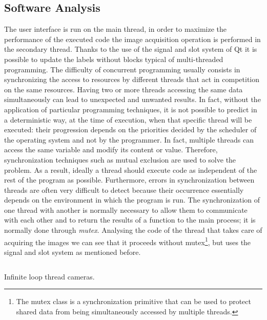 \subsection{Software Analysis}
\label{ssec:raspberry-softw-analysis}
The user interface is run on the main thread, in order to maximize the
performance of the executed code the image acquisition operation is performed in
the secondary thread. Thanks to the use of the signal and slot system of Qt it
is possible to update the labels without blocks typical of multi-threaded
programming. 
The difficulty of concurrent programming usually consists in
synchronizing the access to resources by different threads that act in
competition on the same resources. Having two or more threads accessing the same
data simultaneously can lead to unexpected and unwanted results. 
In fact, without the application of particular programming techniques, it is not
possible to predict in a deterministic way, at the time of execution, when that
specific thread will be executed: their progression depends on the priorities
decided by the scheduler of the operating system and not by the programmer. 
In fact, multiple threads can access the same variable and modify its content or
value. Therefore, synchronization techniques such as mutual exclusion are used
to solve the problem. As a result, ideally a thread should execute code as
independent of the rest of the program as possible. Furthermore, errors in
synchronization between threads are often very difficult to detect because their
occurrence essentially depends on the environment in which the program is run.
The synchronization of one thread with another is normally necessary to allow
them to communicate with each other and to return the results of a function to
the main process; it is normally done through \emph{mutex}\cite{wiki:thread}.
Analysing the code of the thread that takes care of acquiring the images we can 
see that it proceeds without mutex\footnote{The mutex class is a synchronization
primitive that can be used to protect shared data from being simultaneously
accessed by multiple threads.}, but uses the signal and slot system as mentioned
before.
%
\begin{listing}[ht] 
\inputminted[bgcolor=bg,frame=lines,framesep=2mm, linenos=true, autogobble, breaklines=true, fontsize=\scriptsize]{c++}{software/code/leptonthread.cpp} 
\caption{Infinite loop thread cameras.} 
\label{lst:leptonthread} 
\end{listing}
%



















